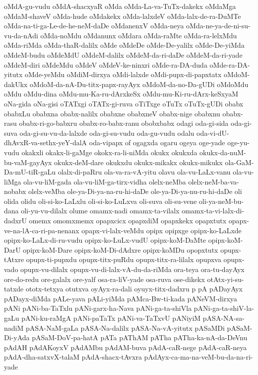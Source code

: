 {oMdA-gu-vudu
oMdA-shacxyaR
oMda
oMda-La-va-TuTx-dakekx
oMdaMga
oMdaM-shaveV
oMda-hude
oMdakekx
oMda-lalxdeV
oMda-lalx-de-ra-DuMTe
oMda-na-ti-ga-Le-de-he-neM-daDe
oMdanenxV
oMda-neya
oMda-ne-ya-de-ni-su-vu-da-nAdi
oMda-noMdu
oMdanunx
oMdara
oMda-raMte
oMda-ra-lelxMdu
oMda-riMda
oMda-thaR-dalilx
oMde
oMdeDe
oMde-De-yalilx
oMde-De-yiMda
oMdeM-budu
oMdeMdU
oMdeM-dalilx
oMdeM-da-ri-daDe
oMdeM-da-ri-yade
oMdeM-diri
oMdeMdu
oMdeV
oMdeV-ke-ninxri
oMde-ra-DA-duda
oMde-ra-DA-yitutx
oMde-yeMdu
oMdiM-dirxya
oMdi-lalxde
oMdi-pupx-di-papxtatx
oMdoM-dakUkx
oMdoM-da-nA-Du-titx-papx-rayAyx
oMdoM-da-no-Da-gUDi
oMdoMdu
oMdu
oMdu-dina
oMdu-mu-Ka-ru-dArxkeSx
oMdu-mu-Ki-ru-dArx-keSxyaM
oNa-gida
oNa-gisi
oTATxgi
oTATx-gi-ruva
oTiTxge
oTuTx
oTuTx-gUDi
obabx
obabxLu
obabxna
obabx-nalilx
obabxne
obabxneV
obabx-nige
obabxnu
obabx-rasu
obabx-ri-go-babxru
obabx-ro-babx-ranu
obobxbabx
odagi
oda-gi-sida
oda-gi-suva
oda-gi-su-vu-da-lalxde
oda-gi-su-vudu
oda-gu-vudu
odalu
oda-vi-dU-dhAvxR-va-sethx-yeY-dalA
oda-vipapx
of
ogagxda
ogaru
ogeya
oge-yade
oge-yu-vudu
okakxli
okakx-li-gaMge
okokx-ra-li-niMda
okukx
okukxda
okukx-da-nuM-bu-vaM-gayAyx
okukx-deM-dare
okukxdu
okukx-mikakx
okukx-mikukx
ola-GaM-Da-mU-tiR-gaLu
olalx-di-paRru
ola-va-ra-vA-yitu
olavu
ola-vu-LaLx-vanu
ola-vu-liMga
ola-vu-liM-gada
ola-vu-liM-ga-tirx-vidha
olelx-neMba
olelx-neM-ba-va-nobabx
olelx-veMba
ole-ya-Di-ya-na-ru-hi-daDe
ole-ya-Di-ya-nu-ru-hi-daDe
oli
olida
olidu
oli-si-ko-LaLxlu
oli-si-ko-LuLxva
oli-suva
oli-su-vene
oli-ya-neM-bu-dana
oli-yu-vu-dilalx
olume
omamx-nadi
omamx-ta-vilalx
omamx-ta-vi-lalx-di-dadxrU
omemx
omomxmemx
opapxcicx
opapxdiM
opapxkekx
opapxtutx
opapx-ve-na-lA-ca-ri-pa-nenanx
opapx-vi-lalx-veMdu
opipx
opipxge
opipx-ko-LaLxde
opipx-ko-LaLx-di-ru-vudu
opipx-ko-LuLx-vudU
opipx-koM-DaMte
opipx-koM-DarU
opipx-koM-Dare
opipx-koM-Di-dAdxre
opipx-koMDu
opopxtutx
opupx-tAtxre
opupx-ti-pupxdu
opupx-titx-puRdu
opupx-titx-ra-lilalx
opupxva
opupx-vado
opupx-vu-dilalx
opupx-vu-di-lalx-vA-du-da-riMda
ora-teya
ora-tu-dayAyx
ore-do-redu
ore-galalx
ore-yalf
osa-ra-liV-yade
osa-ruva
ose-dikekx
otAtx-yi-su-tatxde
ototx-tetxya
otutxva
oyAyx-ra-dali
oyuyx-titx-dadxru
p
pA
pADayAyx
pADayx-diMda
pALe-yava
pALi-yiMda
pAMca-Bw-ti-kada
pANeVM-dirxya
pANi
pANi-ba-TaTxlu
pANi-garx-ha-Nava
pANi-ga-ta-shiVla
pANi-ga-ta-shiV-la-gaLu
pANi-ku-raMgA
pANi-paTaTx
pANi-va-TaTxvU
pANiyiM
pASA-NA-sa-nadiM
pASA-NaM-gaLa
pASA-Na-dalilx
pASA-Na-vA-yitutx
pASaMDi
pASaM-Di-yAda
pASaM-DoV-pa-hatA
pATa
pAThAM
pATha
pATha-ka-nA-da-DeVnu
pAdAH
pAdAKoyxV
pAdAMbu
pAdAM-buva
pAdA-caR-nege
pAdA-caR-neya
pAdA-dha-satxvX-talaM
pAdA-shacx-tAvxra
pAdAyx-ca-ma-na-veM-bu-da-na-ri-yade
}
